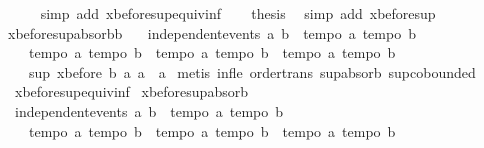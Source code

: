 \begin{isabellebody}
\ \ \ \ \isamarkupfalse%
\ {\isacharparenleft}simp\ add{\isacharcolon}\ xbefore{\isacharunderscore}sup{\isacharunderscore}equiv{\isacharunderscore}inf{\isacharparenright}\isanewline
\ \ \isamarkupfalse%
\ {\isacharquery}thesis\ \isamarkupfalse%
\ {\isacharparenleft}simp\ add{\isacharcolon}\ xbefore{\isacharunderscore}sup{\isacharunderscore}{}{\isacharparenright}\isanewline
{}\isamarkupfalse%
%
\endisatagproof
{\isafoldproof}%
%
\isadelimproof
\isanewline
%
\endisadelimproof
\isanewline
{}\isamarkupfalse%
\ xbefore{\isacharunderscore}sup{\isacharunderscore}absorb{\isacharunderscore}{}b{\isacharcolon}\ \isanewline
\ \ {\isachardoublequoteopen}independent{\isacharunderscore}events\ a\ b\ {\isasymLongrightarrow}\ {\isasymlbrakk}tempo{}\ a{\isacharsemicolon}\ tempo{}\ b{\isasymrbrakk}\ {\isasymLongrightarrow}\ \isanewline
\ \ \ \ {\isasymlbrakk}tempo{}\ a{\isacharsemicolon}\ tempo{}\ b{\isasymrbrakk}\ {\isasymLongrightarrow}\ {\isasymlbrakk}tempo{}\ a{\isacharsemicolon}\ tempo{}\ b{\isasymrbrakk}\ {\isasymLongrightarrow}\ {\isasymlbrakk}tempo{}\ a{\isacharsemicolon}\ tempo{}\ b{\isasymrbrakk}\ {\isasymLongrightarrow}\isanewline
\ \ \ \ sup\ {\isacharparenleft}xbefore\ b\ a{\isacharparenright}\ a\ {\isacharequal}\ a{\isachardoublequoteclose}\isanewline
%
\isadelimproof
%
\endisadelimproof
%
\isatagproof
{}\isamarkupfalse%
\ {\isacharparenleft}metis\ inf{\isacharunderscore}le{}\ order{\isacharunderscore}trans\ sup{\isachardot}absorb{}\ sup{\isachardot}cobounded{}\ \isanewline
\ \ xbefore{\isacharunderscore}sup{\isacharunderscore}equiv{\isacharunderscore}inf{\isacharparenright}%
\endisatagproof
{\isafoldproof}%
%
\isadelimproof
\isanewline
%
\endisadelimproof
\isanewline
{}\isamarkupfalse%
\ xbefore{\isacharunderscore}sup{\isacharunderscore}absorb{\isacharunderscore}{}{\isacharcolon}\ \isanewline
\ \ {\isachardoublequoteopen}independent{\isacharunderscore}events\ a\ b\ {\isasymLongrightarrow}\ {\isasymlbrakk}tempo{}\ a{\isacharsemicolon}\ tempo{}\ b{\isasymrbrakk}\ {\isasymLongrightarrow}\ \isanewline
\ \ \ \ {\isasymlbrakk}tempo{}\ a{\isacharsemicolon}\ tempo{}\ b{\isasymrbrakk}\ {\isasymLongrightarrow}\ {\isasymlbrakk}tempo{}\ a{\isacharsemicolon}\ tempo{}\ b{\isasymrbrakk}\ {\isasymLongrightarrow}\ {\isasymlbrakk}tempo{}\ a{\isacharsemicolon}\ tempo{}\ b{\isasymrbrakk}\ {\isasymLongrightarrow}\isanewline

\end{isabellebody}
